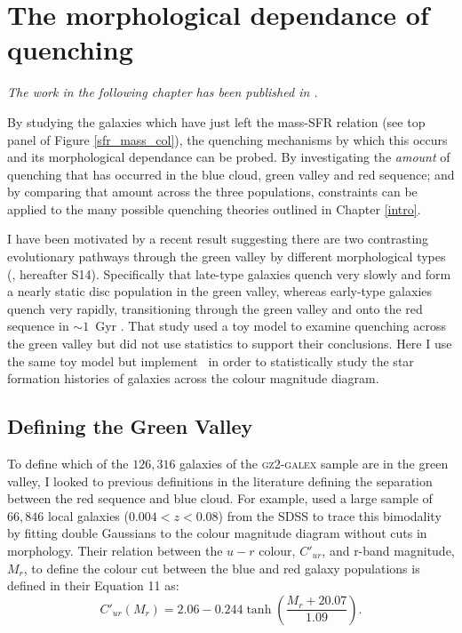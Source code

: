 \chapter{The morphological dependance of quenching}\label{morph}

\emph{The work in the following chapter has been published in \citet{smethurst15}.}


By studying the galaxies which  have just left the mass-SFR relation (see top panel of Figure \ref{sfr_mass_col}),  the quenching mechanisms by which this occurs and its morphological dependance can be probed. By investigating the \emph{amount} of quenching that has occurred in the blue cloud, green valley and red sequence; and by comparing that amount across the three populations, constraints can be applied to the many possible quenching theories outlined in Chapter \ref{intro}. 

I have been motivated by a recent result suggesting there are two contrasting evolutionary pathways through the green valley by different morphological types (\citealt{schawinski14}, hereafter S14). Specifically that late-type galaxies quench very slowly and form a nearly static disc population in the green valley, whereas early-type galaxies quench very rapidly, transitioning through the green valley and onto the red sequence in $\sim 1$~Gyr \citep{Wong12}. That study used a toy model to examine quenching across the green valley but did not use statistics to support their conclusions. Here I use the same toy model but implement \starpy ~in order to statistically study the star formation histories of galaxies across the colour magnitude diagram.


\section{Defining the Green Valley}\label{defGV}

To define which of the $126, 316$ galaxies of the \textsc{gz2-galex} sample are in the green valley, I looked to previous definitions in the literature defining the separation between the red sequence and blue cloud. For example, \citet{Baldry04} used a large sample of $66,846$ local galaxies ($0.004 < z < 0.08$) from the SDSS to trace this bimodality by fitting double Gaussians to the colour magnitude diagram without cuts in morphology. Their relation between the $u-r$ colour, $C'_{ur}$, and r-band magnitude, $M_r$, to define the colour cut between the blue and red galaxy populations is defined in their Equation 11 as:
\begin{equation}\label{eqgv}
C'_{ur}(M_{r}) = 2.06 - 0.244 \tanh \left( \frac{M_r + 20.07}{1.09}\right).
\end{equation}


